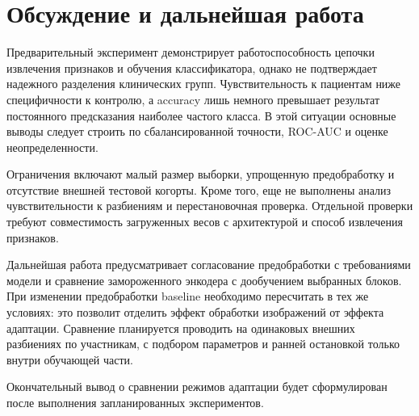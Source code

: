 \documentclass[11pt,a4paper]{article}
\begin{document}
\section{Обсуждение и дальнейшая работа}

Предварительный эксперимент демонстрирует работоспособность цепочки извлечения признаков и обучения классификатора, однако не подтверждает надежного разделения клинических групп. Чувствительность к пациентам ниже специфичности к контролю, а accuracy лишь немного превышает результат постоянного предсказания наиболее частого класса. В этой ситуации основные выводы следует строить по сбалансированной точности, ROC-AUC и оценке неопределенности.

Ограничения включают малый размер выборки, упрощенную предобработку и отсутствие внешней тестовой когорты. Кроме того, еще не выполнены анализ чувствительности к разбиениям и перестановочная проверка. Отдельной проверки требуют совместимость загруженных весов с архитектурой и способ извлечения признаков.

Дальнейшая работа предусматривает согласование предобработки с требованиями модели и сравнение замороженного энкодера с дообучением выбранных блоков. При изменении предобработки baseline необходимо пересчитать в тех же условиях: это позволит отделить эффект обработки изображений от эффекта адаптации. Сравнение планируется проводить на одинаковых внешних разбиениях по участникам, с подбором параметров и ранней остановкой только внутри обучающей части.

Окончательный вывод о сравнении режимов адаптации будет сформулирован после выполнения запланированных экспериментов.

\end{document}
